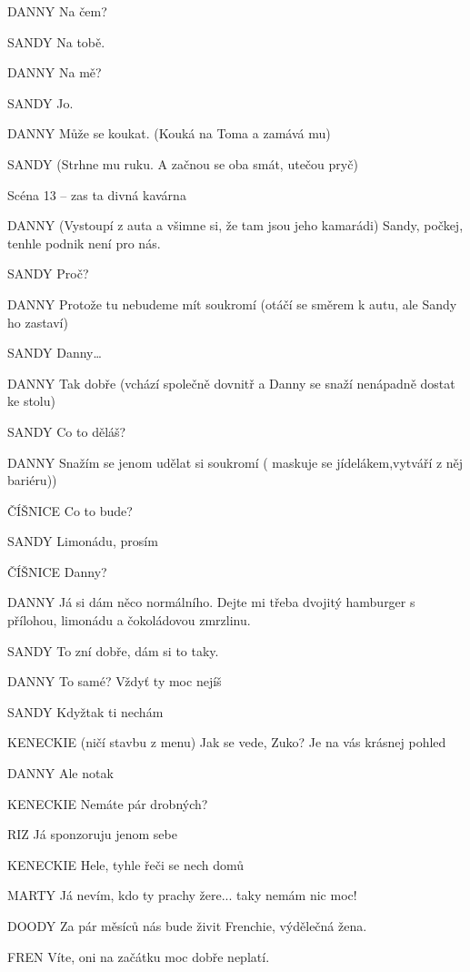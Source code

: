 DANNY        Na čem? 

SANDY        Na tobě. 

DANNY        Na mě? 

SANDY        Jo. 

DANNY        Může se koukat. (Kouká na Toma a zamává mu)

SANDY        (Strhne mu ruku. A začnou se oba smát, utečou pryč) 

Scéna 13 – zas ta divná kavárna 

DANNY         (Vystoupí z auta a všimne si, že tam jsou jeho kamarádi) Sandy, počkej,           tenhle podnik není pro nás. 

SANDY         Proč? 

DANNY        Protože tu nebudeme mít soukromí (otáčí se směrem k autu, ale Sandy         ho zastaví) 

SANDY        Danny… 

DANNY         Tak dobře (vchází společně dovnitř a Danny se snaží nenápadně dostat         ke stolu) 

SANDY         Co to děláš? 

DANNY         Snažím se jenom udělat si soukromí ( maskuje se jídelákem,vytváří z něj bariéru))

ČÍŠNICE         Co to bude? 

SANDY        Limonádu, prosím 

ČÍŠNICE         Danny? 

DANNY        Já si dám něco normálního. Dejte mi třeba dvojitý hamburger s přílohou,         limonádu a čokoládovou zmrzlinu. 

SANDY        To zní dobře, dám si to taky. 

DANNY         To samé? Vždyť ty moc nejíš 

SANDY         Kdyžtak ti nechám 

KENECKIE        (ničí stavbu z menu) Jak se vede, Zuko? Je na vás krásnej pohled 

DANNY         Ale notak

KENECKIE        Nemáte pár drobných?

RIZ                Já sponzoruju jenom sebe 

KENECKIE        Hele, tyhle řeči se nech domů 

MARTY        Já nevím, kdo ty prachy žere... taky nemám nic moc! 

DOODY        Za pár měsíců nás bude živit Frenchie, výdělečná žena. 

FREN        Víte, oni na začátku moc dobře neplatí. 


